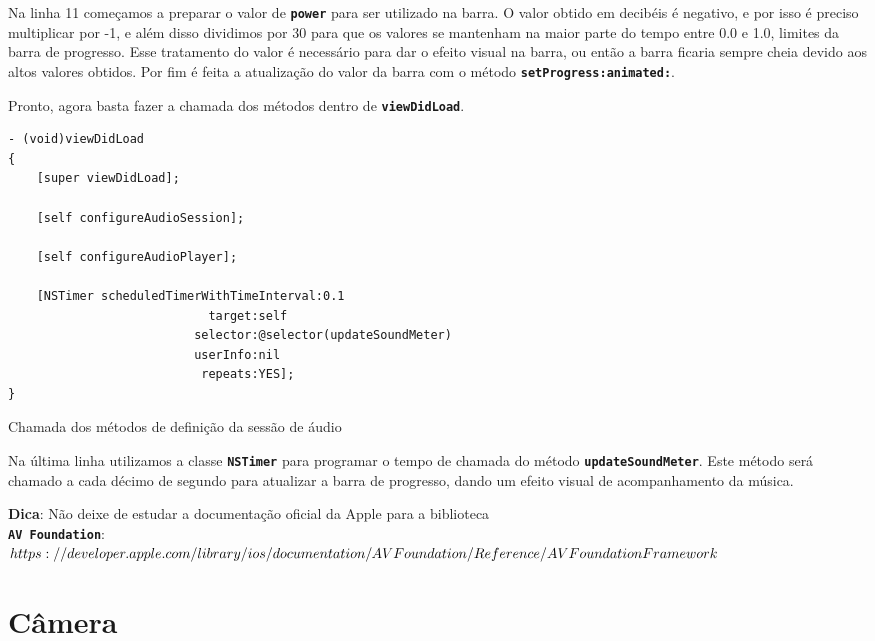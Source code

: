 \documentclass[a4paper,12pt,brazil,oneside]{book}
\begin{document}
Na linha 11 começamos a preparar o valor de \texttt{\textbf{power}} para ser utilizado na barra. O valor obtido em decibéis é negativo, e por isso é preciso multiplicar por -1, e além disso dividimos por 30 para que os valores se mantenham na maior parte do tempo entre 0.0 e 1.0, limites da barra de progresso. Esse tratamento do valor é necessário para dar o efeito visual na barra, ou então a barra ficaria sempre cheia devido aos altos valores obtidos. Por fim é feita a atualização do valor da barra com o método \texttt{\textbf{setProgress:animated:}}.

Pronto, agora basta fazer a chamada dos métodos dentro de \texttt{\textbf{viewDidLoad}}.

\begin{listing}[H]
\begin{verbatim}
- (void)viewDidLoad
{
    [super viewDidLoad];
    
    [self configureAudioSession];
    
    [self configureAudioPlayer];
    
    [NSTimer scheduledTimerWithTimeInterval:0.1
                            target:self
                          selector:@selector(updateSoundMeter)
                          userInfo:nil
                           repeats:YES];
}
\end{verbatim}
\caption{Chamada dos métodos de definição da sessão de áudio}
\end{listing}


Na última linha utilizamos a classe \texttt{\textbf{NSTimer}} para programar o tempo de chamada do método \texttt{\textbf{updateSoundMeter}}. Este método será chamado a cada décimo de segundo para atualizar a barra de progresso, dando um efeito visual de acompanhamento da música.

\begin{framed}

\textbf{Dica}: Não deixe de estudar a documentação oficial da Apple para a biblioteca\\  \texttt{\textbf{AV Foundation}}:\\
\(https://developer.apple.com/library/ios/documentation/AVFoundation/Reference/\\AVFoundationFramework\)
\end{framed}

\section{Câmera}
\end{document}
